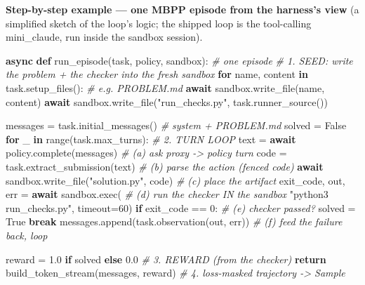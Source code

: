 \documentclass[
  paper=a4,
  ,captions=tableheading
]{scrartcl}
\newenvironment{Shaded}{}{}
\newcommand{\BuiltInTok}[1]{\textcolor[rgb]{0.00,0.50,0.00}{#1}}
\newcommand{\CommentTok}[1]{\textcolor[rgb]{0.38,0.63,0.69}{\textit{#1}}}
\newcommand{\ControlFlowTok}[1]{\textcolor[rgb]{0.00,0.44,0.13}{\textbf{#1}}}
\newcommand{\DecValTok}[1]{\textcolor[rgb]{0.25,0.63,0.44}{#1}}
\newcommand{\FloatTok}[1]{\textcolor[rgb]{0.25,0.63,0.44}{#1}}
\newcommand{\KeywordTok}[1]{\textcolor[rgb]{0.00,0.44,0.13}{\textbf{#1}}}
\newcommand{\NormalTok}[1]{#1}
\newcommand{\OperatorTok}[1]{\textcolor[rgb]{0.40,0.40,0.40}{#1}}
\newcommand{\StringTok}[1]{\textcolor[rgb]{0.25,0.44,0.63}{#1}}
\newcommand{\VariableTok}[1]{\textcolor[rgb]{0.10,0.09,0.49}{#1}}
\begin{document}
\textbf{Step-by-step example --- one MBPP episode from the harness's
view} (a simplified sketch of the loop's logic; the shipped loop is the
tool-calling mini\_claude, run inside the sandbox session).

\begin{Shaded}
\begin{Highlighting}[]
\ControlFlowTok{async} \KeywordTok{def}\NormalTok{ run\_episode(task, policy, sandbox):          }\CommentTok{\# one episode}
    \CommentTok{\# 1. SEED: write the problem + the checker into the fresh sandbox}
    \ControlFlowTok{for}\NormalTok{ name, content }\KeywordTok{in}\NormalTok{ task.setup\_files():           }\CommentTok{\# e.g. PROBLEM.md}
        \ControlFlowTok{await}\NormalTok{ sandbox.write\_file(name, content)}
    \ControlFlowTok{await}\NormalTok{ sandbox.write\_file(}\StringTok{"run\_checks.py"}\NormalTok{, task.runner\_source())}

\NormalTok{    messages }\OperatorTok{=}\NormalTok{ task.initial\_messages()                 }\CommentTok{\# system + PROBLEM.md}
\NormalTok{    solved }\OperatorTok{=} \VariableTok{False}
    \ControlFlowTok{for}\NormalTok{ \_ }\KeywordTok{in} \BuiltInTok{range}\NormalTok{(task.max\_turns):                    }\CommentTok{\# 2. TURN LOOP}
\NormalTok{        text }\OperatorTok{=} \ControlFlowTok{await}\NormalTok{ policy.complete(messages)         }\CommentTok{\#    (a) ask proxy {-}\textgreater{} policy turn}
\NormalTok{        code }\OperatorTok{=}\NormalTok{ task.extract\_submission(text)           }\CommentTok{\#    (b) parse the action (fenced code)}
        \ControlFlowTok{await}\NormalTok{ sandbox.write\_file(}\StringTok{"solution.py"}\NormalTok{, code)  }\CommentTok{\#    (c) place the artifact}
\NormalTok{        exit\_code, out, err }\OperatorTok{=} \ControlFlowTok{await}\NormalTok{ sandbox.}\BuiltInTok{exec}\NormalTok{(       }\CommentTok{\#    (d) run the checker IN the sandbox}
            \StringTok{"python3 run\_checks.py"}\NormalTok{, timeout}\OperatorTok{=}\DecValTok{60}\NormalTok{)}
        \ControlFlowTok{if}\NormalTok{ exit\_code }\OperatorTok{==} \DecValTok{0}\NormalTok{:                              }\CommentTok{\#    (e) checker passed?}
\NormalTok{            solved }\OperatorTok{=} \VariableTok{True}
            \ControlFlowTok{break}
\NormalTok{        messages.append(task.observation(out, err))    }\CommentTok{\#    (f) feed the failure back, loop}

\NormalTok{    reward }\OperatorTok{=} \FloatTok{1.0} \ControlFlowTok{if}\NormalTok{ solved }\ControlFlowTok{else} \FloatTok{0.0}                    \CommentTok{\# 3. REWARD (from the checker)}
    \ControlFlowTok{return}\NormalTok{ build\_token\_stream(messages, reward)        }\CommentTok{\# 4. loss{-}masked trajectory {-}\textgreater{} Sample}
\end{Highlighting}
\end{Shaded}
\end{document}
